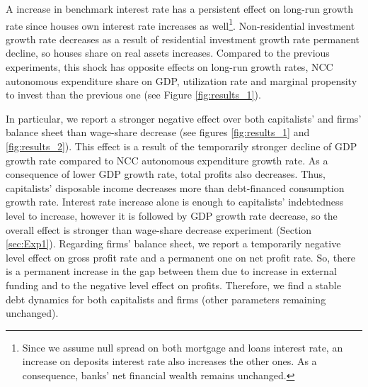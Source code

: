 \documentclass[12pt]{article}
\begin{document}
A increase in benchmark interest rate  has a persistent effect on long-run growth rate since houses own interest rate increases as well\footnote{Since we assume null spread on both mortgage and loans interest rate, an increase on deposits interest rate also increases the other ones. As a consequence, banks' net financial wealth remains unchanged.}.
Non-residential investment growth rate decreases as a result of residential investment growth rate permanent decline, so houses share on real assets increases.
Compared to the previous experiments, this shock has opposite effects on long-run growth rates, NCC autonomous expenditure share on GDP, utilization rate and marginal propensity to invest  than the previous one (see Figure \ref{fig:results_1}).


In particular, we report a stronger negative effect over both capitalists' and firms' balance sheet than wage-share decrease (see figures \ref{fig:results_1} and \ref{fig:results_2}).
This effect is a result of the temporarily stronger decline of GDP growth rate compared to NCC autonomous expenditure growth rate.
As a consequence of lower GDP growth rate, total profits also decreases.
Thus, capitalists' disposable income decreases more than debt-financed consumption growth rate.
Interest rate increase alone is enough to capitalists' indebtedness level to increase, however it is followed by GDP growth rate decrease, so the overall effect is stronger than wage-share decrease experiment (Section \ref{sec:Exp1}).
Regarding firms' balance sheet, we report a temporarily negative level effect on gross profit rate and a permanent one on net profit rate. 
So, there is a permanent increase in the gap between them due to increase in external funding and to the negative level effect on profits.
Therefore, we find a stable debt dynamics for both capitalists and firms (other parameters remaining unchanged).
\end{document}
